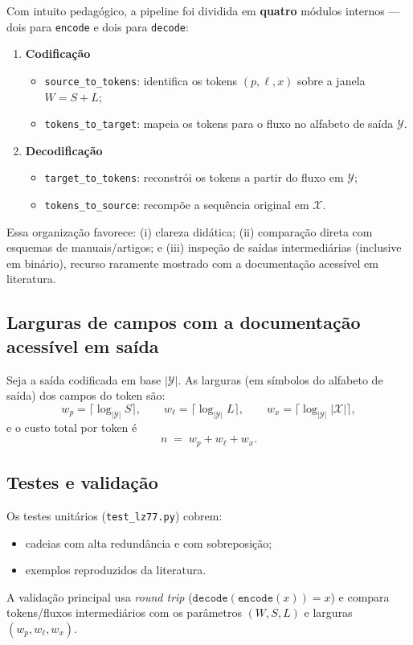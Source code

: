 Com intuito pedagógico, a pipeline foi dividida em \textbf{quatro} módulos
internos — dois para \texttt{encode} e dois para \texttt{decode}:
\begin{enumerate}
    \item \textbf{Codificação}
          \begin{itemize}
              \item \texttt{source\_to\_tokens}: identifica os tokens \((p,\ell,x)\) sobre a janela \(W=S+L\);
              \item \texttt{tokens\_to\_target}: mapeia os tokens para o fluxo no alfabeto de saída \(\mathcal{Y}\).
          \end{itemize}
    \item \textbf{Decodificação}
          \begin{itemize}
              \item \texttt{target\_to\_tokens}: reconstrói os tokens a partir do fluxo em \(\mathcal{Y}\);
              \item \texttt{tokens\_to\_source}: recompõe a sequência original em \(\mathcal{X}\).
          \end{itemize}
\end{enumerate}

Essa organização favorece: (i) clareza didática; (ii) comparação direta com
esquemas de manuais/artigos; e (iii) inspeção de saídas intermediárias
(inclusive em binário), recurso raramente mostrado com a documentação acessível
em \url{} literatura.

\subsection{Larguras de campos com a documentação acessível em \url{} saída}\label{subsec:larguras}

Seja a saída codificada em base \( |\mathcal{Y}| \). As larguras (em símbolos
do alfabeto de saída) dos campos do token são:
\[
    w_p = \big\lceil \log_{|\mathcal{Y}|} S \big\rceil,\qquad
    w_\ell = \big\lceil \log_{|\mathcal{Y}|} L \big\rceil,\qquad
    w_x = \big\lceil \log_{|\mathcal{Y}|} |\mathcal{X}| \big\rceil,
\]
e o custo total por token é
\[
    n \;=\; w_p + w_\ell + w_x.
\]

\subsection{Testes e validação}\label{subsec:testes}

Os testes unitários (\texttt{test\_lz77.py}) cobrem:
\begin{itemize}
    \item cadeias com alta redundância e com sobreposição;
    \item exemplos reproduzidos da literatura.
\end{itemize}
A validação principal usa \textit{round trip} (\(\texttt{decode}(\texttt{encode}(x)) = x\)) e compara tokens/fluxos intermediários com os parâmetros \((W,S,L)\) e larguras \((w_p,w_\ell,w_x)\).

